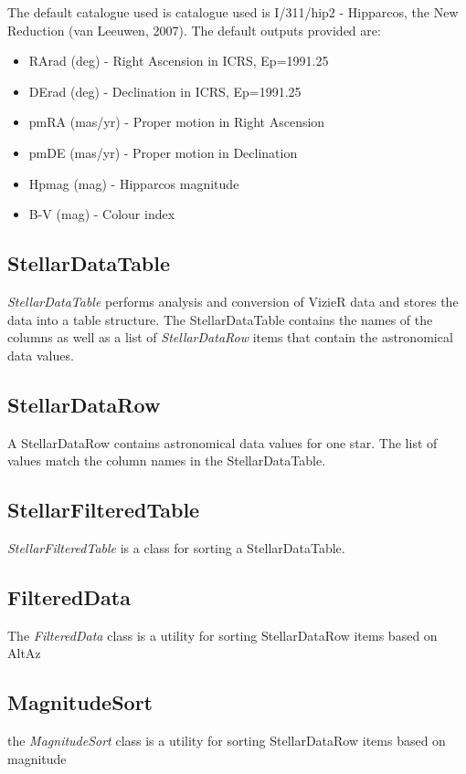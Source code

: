 The default catalogue used is catalogue used is I/311/hip2 - Hipparcos, the New Reduction (van Leeuwen, 2007). The default outputs provided are:

\begin{itemize}
	\item RArad (deg) -  Right Ascension in ICRS, Ep=1991.25 
	\item DErad (deg) -  Declination in ICRS, Ep=1991.25
	\item pmRA (mas/yr) -  Proper motion in Right Ascension
	\item pmDE (mas/yr) - Proper motion in Declination 
	\item Hpmag (mag) - Hipparcos magnitude
	\item B-V (mag) -  Colour index
\end{itemize}

 \subsection{StellarDataTable}
\textit{StellarDataTable} performs analysis and conversion of VizieR data   and stores the data into a table structure. The StellarDataTable contains the names of the columns as well as a list of \textit{StellarDataRow} items that contain the astronomical data values.

\subsection{StellarDataRow}
A StellarDataRow contains astronomical data values for one star. The list of values match the column names in the StellarDataTable.

\subsection{StellarFilteredTable}
\textit{StellarFilteredTable} is a class for sorting a StellarDataTable.

 \subsection{FilteredData}
The \textit{FilteredData} class is a utility for sorting StellarDataRow items based on AltAz

\subsection{MagnitudeSort}
the \textit{MagnitudeSort} class is a utility for sorting StellarDataRow items based on magnitude


